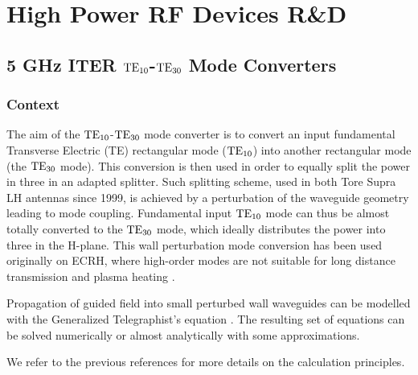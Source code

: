 {\clearpage

\section{High Power RF Devices R\&D}\label{sec:RF_components}

\subsection{5 GHz ITER ${\mathrm{TE}}_{10}$-${\mathrm{TE}}_{30}$ Mode Converters}\label{sec:mode_converter}

\subsubsection{Context}
The aim of the ${\mathrm{TE}}_{10}$-${\mathrm{TE}}_{30}$ mode converter is to convert an input fundamental Transverse Electric (TE) rectangular mode (${\mathrm{TE}}_{10}$) into another rectangular mode (the ${\mathrm{TE}}_{30}$ mode). This conversion is then used in order to equally split the power in three in an adapted splitter. Such splitting scheme, used in both Tore Supra LH antennas since 1999, is achieved by a perturbation of the waveguide geometry leading to mode coupling. Fundamental input ${\mathrm{TE}}_{10}$ mode can thus be almost totally converted to the ${\mathrm{TE}}_{30}$ mode, which ideally distributes the power into three in the H-plane. This wall perturbation mode conversion has been used originally on ECRH, where high-order modes are not suitable for long distance transmission and plasma heating \cite{thumm1987-1, thumm2002}. 

Propagation of guided field into small perturbed wall waveguides can be modelled with the Generalized Telegraphist's equation . The resulting set of equations can be solved numerically  or almost analytically with some approximations\cite{unger1958, solymar1959}. 

We refer to the previous references for more details on the calculation principles. 

}
